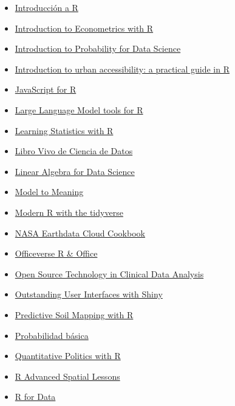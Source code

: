 \documentclass[
  letterpaper,
  DIV=11,
  numbers=noendperiod]{scrartcl}
\begin{document}
\begin{itemize}
{  Machine Learning}
\item
  \href{https://cran.r-project.org/doc/contrib/R-intro-1.1.0-espanol.1.pdf}{Introducción
  a R}
\item
  \href{https://www.econometrics-with-r.org/}{Introduction to
  Econometrics with R}
\item
  \href{https://probability4datascience.com/index.html}{Introduction to
  Probability for Data Science}
\item
  \href{https://github.com/ipeaGIT/intro_access_book}{Introduction to
  urban accessibility: a practical guide in R}
\item
  \href{https://book.javascript-for-r.com/}{JavaScript for R}
\item
  \href{https://luisdva.github.io/llmsr-book/}{Large Language Model
  tools for R}
\item
  \href{https://learningstatisticswithr.com/}{Learning Statistics with
  R}
\item
  \href{https://librovivodecienciadedatos.ai/}{Libro Vivo de Ciencia de
  Datos}
\item
  \href{https://shainarace.github.io/LinearAlgebra/index.html}{Linear
  Algebra for Data Science}
\item
  \href{https://marginaleffects.com/}{Model to Meaning}
\item
  \href{https://b-rodrigues.github.io/modern_R/}{Modern R with the
  tidyverse}
\item
  \href{https://nasa-openscapes.github.io/earthdata-cloud-cookbook/}{NASA
  Earthdata Cloud Cookbook}
\item
  \href{https://ardata-fr.github.io/officeverse/index.html}{Officeverse
  R \& Office}
\item
  \href{https://phuse-org.github.io/OSTCDA/}{Open Source Technology in
  Clinical Data Analysis}
\item
  \href{https://unleash-shiny.rinterface.com/}{Outstanding User
  Interfaces with Shiny}
\item
  \href{https://soilmapper.org/}{Predictive Soil Mapping with R}
\item
  \href{https://www.uv.es/ayala/docencia/probabilidad/prob.pdf}{Probabilidad
  básica}
\item
  \href{http://qpolr.com/}{Quantitative Politics with R}
\item
  \href{https://bbest.github.io/R-adv-spatial-lessons/}{R Advanced
  Spatial Lessons}
\item
  \href{https://trevorfrench.github.io/R-for-Data-Analysis/}{R for Data
}
\end{itemize}
\end{document}
